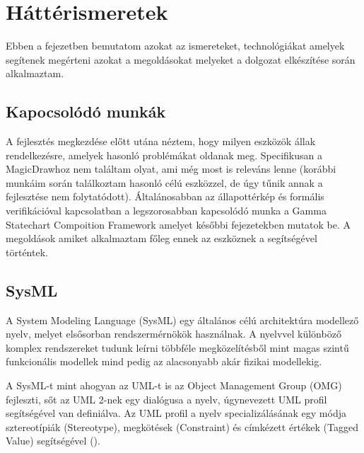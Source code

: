 \chapter{Háttérismeretek}

Ebben a fejezetben bemutatom azokat az ismereteket, technológiákat amelyek segítenek megérteni azokat a megoldásokat melyeket a dolgozat elkészítése során alkalmaztam.

\section{Kapocsolódó munkák}
A fejlesztés megkezdése előtt utána néztem, hogy milyen eszközök állak rendelkezésre, amelyek hasonló problémákat oldanak meg. Specifikusan a MagicDrawhoz nem találtam olyat, ami még most is releváns lenne (korábbi munkáim során találkoztam hasonló célú eszközzel, de úgy tűnik annak a fejlesztése nem folytatódott). Általánosabban az állapottérkép és formális verifikációval kapcsolatban a legszorosabban kapcsolódó munka a Gamma Statechart Compoition Framework amelyet későbbi fejezetekben mutatok be. A megoldások amiket alkalmaztam főleg ennek az eszköznek a segítségével történtek.

\section{SysML}

A System Modeling Language (SysML) egy általános célú architektúra modellező nyelv, melyet elsősorban rendszermérnökök használnak. A nyelvvel különböző komplex rendszereket tudunk leírni többféle megközelítésből mint magas szintű funkcionális modellek mind pedig az alacsonyabb akár fizikai modellekig.

A SysML-t mint ahogyan az UML-t is az Object Management Group (OMG) fejleszti, sőt az UML 2-nek egy dialógusa a nyelv, úgynevezett UML profil segítségével van definiálva. Az UML profil a nyelv specializálásának egy módja sztereotípiák (Stereotype), megkötések (Constraint) és címkézett értékek (Tagged Value) segítségével ().

